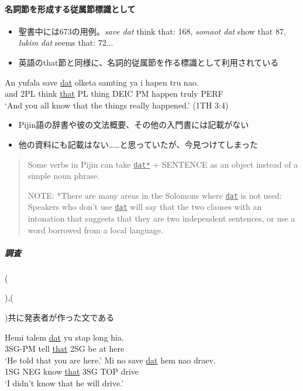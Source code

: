 \documentclass[11pt,a4paper]{jsarticle}
\newcounter{tempcnt}
\newcommand{\exn}[1]{%
\setcounter{tempcnt}{\value{exx}}%
\addtocounter{tempcnt}{#1}%
\arabic{tempcnt}}
\begin{document}
\paragraph{名詞節を形成する従属節標識として}
\begin{itemize}
  \item 聖書中には673の用例。\textit{save dat} think that: 168, \textit{somaot dat} show that 87, \textit{lukim dat} seems that: 72...
  \item 英語のthat節と同様に、名詞的従属節を作る標識として利用されている
\end{itemize}
\begin{exe}
\ex
\gll An yufala save \underline{dat} olketa samting ya i hapen tru nao.\\
and 2PL think \underline{that} PL thing DEIC PM happen truly PERF\\
\glt `And you all know that the things really happened.' (1TH 3:4)
\end{exe}
\begin{itemize}
  \item Pijin語の辞書\cite{dictionary}や彼の文法概要\cite{syntax}、その他の入門書\cite{yumi}には記載がない
  \item 他の資料にも記載はない……と思っていたが、今見つけてしまった
\end{itemize}
\cite{eric}
\begin{quote}
Some verbs in Pijin can take \underline{\texttt{dat*}} + SENTENCE as an object instead of a simple noun phrase.
\begin{screen}
NOTE: *There are many areas in the Solomons where \underline{\texttt{dat}} is not used: Speakers who don't use \underline{\texttt{dat}} will say that the two clauses with an intonation that suggests that they are two independent sentences, or use a word borrowed from a local language.
\end{screen}
\end{quote}

\subparagraph{調査}
(\exn{1}),(\exn{2})共に発表者が作った文である
\begin{exe}
\ex
\gll Hemi talem \underline{dat} yu stap long hia.\\
3SG-PM tell \underline{that} 2SG be at here\\
\glt `He told that you are here.'
\ex
\gll Mi no save \underline{dat} hem nao draev.\\
1SG NEG know \underline{that} 3SG TOP drive\\
\glt `I didn't know that he will drive.'
\end{exe}
\end{document}
